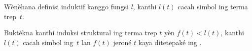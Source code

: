 \documentclass[../../../include/open-logic-section]{subfiles}
\begin{document}
\begin{prob}
  Wènèhana definisi
  induktif kanggo fungsi $l$,
  kanthi $l(t)$ cacah
  simbol ing terma trep~$t$.
\end{prob}

\begin{prob}
  Buktèkna kanthi induksi
  struktural ing terma trep
  $t$ yèn $f(t) < l(t)$,
  kanthi $l(t)$ cacah simbol
  ing~$t$ lan $f(t)$
  jeroné $t$ kaya
  ditetepaké ing
  .
\end{prob}
\end{document}
